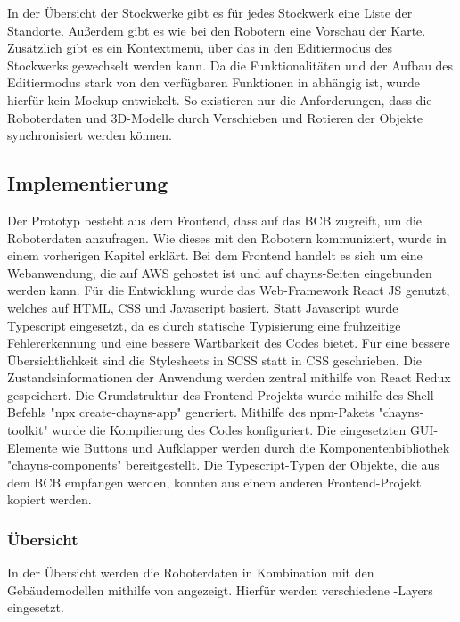 In der Übersicht der Stockwerke gibt es für jedes Stockwerk eine Liste der Standorte. Außerdem gibt es wie bei den Robotern eine Vorschau der Karte. Zusätzlich gibt es ein Kontextmenü, über das in den Editiermodus des Stockwerks gewechselt werden kann. Da die Funktionalitäten und der Aufbau des Editiermodus stark von den verfügbaren Funktionen in \deckgl{} abhängig ist, wurde hierfür kein Mockup entwickelt. So existieren nur die Anforderungen, dass die Roboterdaten und 3D-Modelle durch Verschieben und Rotieren der Objekte synchronisiert werden können.  

\subsection{Implementierung}
Der Prototyp besteht aus dem Frontend, dass auf das \ac{BCB} zugreift, um die Roboterdaten anzufragen. Wie dieses mit den Robotern kommuniziert, wurde in einem vorherigen Kapitel erklärt. %
Bei dem Frontend handelt es sich um eine Webanwendung, die auf AWS gehostet ist und auf chayns-Seiten eingebunden werden kann. Für die Entwicklung wurde das Web-Framework React JS genutzt, welches auf HTML, CSS und Javascript basiert. Statt Javascript wurde Typescript eingesetzt, da es durch statische Typisierung eine frühzeitige Fehlererkennung und eine bessere Wartbarkeit des Codes bietet. Für eine bessere Übersichtlichkeit sind die Stylesheets in SCSS statt in CSS geschrieben. Die Zustandsinformationen der Anwendung werden zentral mithilfe von React Redux gespeichert. Die Grundstruktur des Frontend-Projekts wurde mihilfe des Shell Befehls "npx create-chayns-app" generiert. Mithilfe des npm-Pakets "chayns-toolkit" wurde die Kompilierung des Codes konfiguriert. Die eingesetzten GUI-Elemente wie Buttons und Aufklapper werden durch die Komponentenbibliothek "chayns-components" bereitgestellt. Die Typescript-Typen der Objekte, die aus dem \ac{BCB} empfangen werden, konnten aus einem anderen Frontend-Projekt kopiert werden.


\subsubsection{Übersicht}
In der Übersicht werden die Roboterdaten in Kombination mit den Gebäudemodellen mithilfe von \deckgl{} angezeigt. Hierfür werden verschiedene \deckgl{}-Layers eingesetzt.

